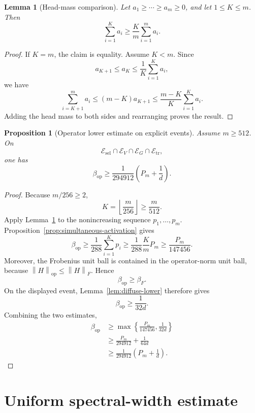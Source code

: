 \documentclass[11pt]{article}
\newtheorem{proposition}[theorem]{Proposition}
\newtheorem{lemma}[theorem]{Lemma}
\newcommand{\1}{\mathbf{1}}
\newcommand{\op}{\mathrm{op}}
\newcommand{\norm}[1]{\left\|#1\right\|}
\begin{document}
\begin{lemma}[Head-mass comparison]
\label{lem:head-mass}
Let \(a_1\ge\cdots\ge a_m\ge0\), and let \(1\le K\le m\).  Then
\[
 \sum_{i=1}^K a_i
 \ge
 \frac Km\sum_{i=1}^m a_i.
\]
\end{lemma}

\begin{proof}
If \(K=m\), the claim is equality.  Assume \(K<m\).  Since
\[
 a_{K+1}\le a_K\le\frac1K\sum_{i=1}^K a_i,
\]
we have
\[
 \sum_{i=K+1}^m a_i
 \le
 (m-K)a_{K+1}
 \le
 \frac{m-K}{K}\sum_{i=1}^K a_i.
\]
Adding the head mass to both sides and rearranging proves the result.
\end{proof}

\begin{proposition}[Operator lower estimate on explicit events]
\label{prop:operator-lower}
Assume \(m\ge512\).  On
\[
 \mathcal E_{\mathrm{sel}}
 \cap\mathcal E_V
 \cap\mathcal E_G
 \cap\mathcal E_{\mathrm{tr}},
\]
one has
\[
 \beta_{\op}
 \ge
 \frac1{294912}\left(P_m+\frac1d\right).
\]
\end{proposition}

\begin{proof}
Because \(m/256\ge2\),
\[
 K=\left\lfloor\frac{m}{256}\right\rfloor
 \ge\frac{m}{512}.
\]
Apply Lemma~\ref{lem:head-mass} to the nonincreasing sequence
\(p_1,\ldots,p_m\).  Proposition~\ref{prop:simultaneous-activation} gives
\[
 \beta_{\op}
 \ge
 \frac1{288}\sum_{i=1}^Kp_i
 \ge
 \frac1{288}\frac KmP_m
 \ge
 \frac{P_m}{147456}.
\]
Moreover, the Frobenius unit ball is contained in the operator-norm unit ball,
because \(\norm{H}_{\op}\le\norm{H}_F\).  Hence
\[
 \beta_{\op}\ge\beta_F.
\]
On the displayed event, Lemma~\ref{lem:diffuse-lower} therefore gives
\[
 \beta_{\op}\ge\frac1{32d}.
\]
Combining the two estimates,
\begin{align*}
 \beta_{\op}
 &\ge
 \max\left\{\frac{P_m}{147456},\frac1{32d}\right\}\\
 &\ge
 \frac{P_m}{294912}+\frac1{64d}\\
 &\ge
 \frac1{294912}\left(P_m+\frac1d\right).
\end{align*}
\end{proof}

\section{Uniform spectral-width estimate}
\label{sec:block-width}
\end{document}

